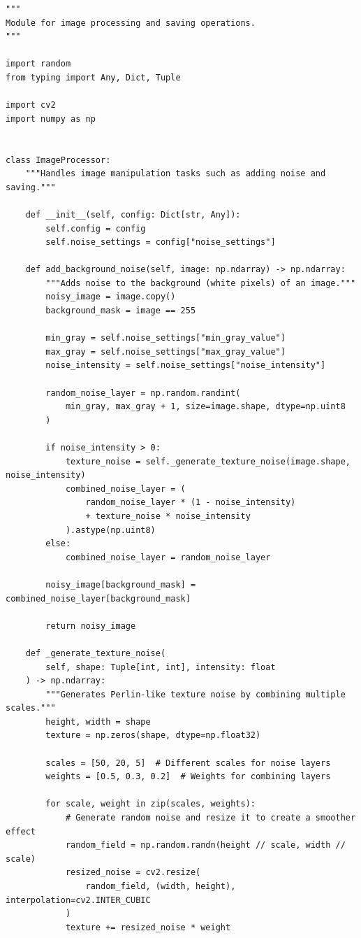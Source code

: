 \documentclass[code]{wordcore}
\begin{document}
\begin{code}
	\begin{verbatim}
"""
Module for image processing and saving operations.
"""

import random
from typing import Any, Dict, Tuple

import cv2
import numpy as np


class ImageProcessor:
    """Handles image manipulation tasks such as adding noise and saving."""

    def __init__(self, config: Dict[str, Any]):
        self.config = config
        self.noise_settings = config["noise_settings"]

    def add_background_noise(self, image: np.ndarray) -> np.ndarray:
        """Adds noise to the background (white pixels) of an image."""
        noisy_image = image.copy()
        background_mask = image == 255

        min_gray = self.noise_settings["min_gray_value"]
        max_gray = self.noise_settings["max_gray_value"]
        noise_intensity = self.noise_settings["noise_intensity"]

        random_noise_layer = np.random.randint(
            min_gray, max_gray + 1, size=image.shape, dtype=np.uint8
        )

        if noise_intensity > 0:
            texture_noise = self._generate_texture_noise(image.shape, noise_intensity)
            combined_noise_layer = (
                random_noise_layer * (1 - noise_intensity)
                + texture_noise * noise_intensity
            ).astype(np.uint8)
        else:
            combined_noise_layer = random_noise_layer

        noisy_image[background_mask] = combined_noise_layer[background_mask]

        return noisy_image

    def _generate_texture_noise(
        self, shape: Tuple[int, int], intensity: float
    ) -> np.ndarray:
        """Generates Perlin-like texture noise by combining multiple scales."""
        height, width = shape
        texture = np.zeros(shape, dtype=np.float32)

        scales = [50, 20, 5]  # Different scales for noise layers
        weights = [0.5, 0.3, 0.2]  # Weights for combining layers

        for scale, weight in zip(scales, weights):
            # Generate random noise and resize it to create a smoother effect
            random_field = np.random.randn(height // scale, width // scale)
            resized_noise = cv2.resize(
                random_field, (width, height), interpolation=cv2.INTER_CUBIC
            )
            texture += resized_noise * weight


\end{verbatim}
\end{code}
\end{document}

